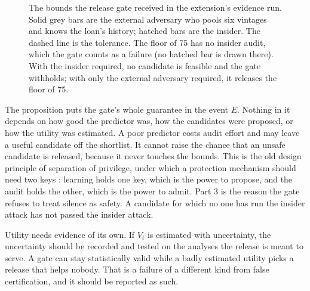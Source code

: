 \begin{figure}[ht]
\centering
{}
\caption{The bounds the release gate received in the extension's evidence run. Solid grey bars
are the external adversary who pools six vintages and knows the loan's history; hatched bars are the
insider. The dashed line is the tolerance. The floor of 75 has no insider audit, which the gate counts
as a failure (no hatched bar is drawn there). With the insider required, no candidate is feasible and the gate withholds; with only the
external adversary required, it releases the floor of 75.}
\label{c18:fig-gate}
\end{figure}

The proposition puts the gate's whole guarantee in the event $E$. Nothing in it depends
on how good the predictor was, how the candidates were proposed, or how the utility was
estimated. A poor predictor costs audit effort and may leave a useful candidate off the
shortlist. It cannot raise the chance that an unsafe candidate is released, because it never
touches the bounds. This is the old design principle of separation of privilege, under which
a protection mechanism should need two keys \citep{saltzer1975}: learning holds
one key, which is the power to propose, and the audit holds the other, which is the power to
admit. Part 3 is the reason the gate refuses to treat silence as safety. A candidate for which
no one has run the insider attack has not passed the insider attack.

Utility needs evidence of its own. If $V_t$ is estimated with uncertainty, the uncertainty
should be recorded and tested on the analyses the release is meant to serve. A gate can stay
statistically valid while a badly estimated utility picks a release that helps nobody. That is a
failure of a different kind from false certification, and it should be reported as such.

